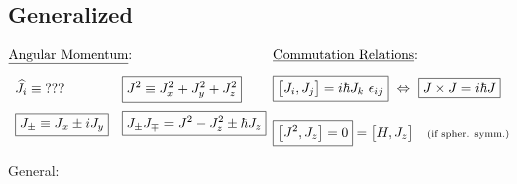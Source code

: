 \documentclass[12pt]{article}
\newcommand{\hs}{\hspace{1pt}} %
\begin{document}
\subsection{Generalized}
\noindent
\(
    \begin{aligned}[t]
        & \text{\underline{Angular Momentum}:}
            \\[5pt]
        & \begin{array}[t]{l l}
                \widehat{J}_i \equiv \text{???} & \boxed{ J^2 \equiv J_x^2 + J_y^2 + J_z^2 } \\[10pt]
                \boxed{ J_\pm \equiv J_x \pm i J_y } & \boxed{ J_\pm J_\mp = J^2 - J_z^2 \pm \hbar J_z }
            \end{array}
    \end{aligned}
    \hfill
    \begin{aligned}[t]
        & \text{\underline{Commutation Relations}:} \\[5pt]
        & \boxed{ \big[ J_i , J_j \big] = i \hbar J_k \ \epsilon_{ij} }
            \ \Leftrightarrow\ 
            \boxed{ J \times J = i \hbar J }
            \\[10pt]
        & \boxed{ \big[ J^2 , J_z \big] = 0 } = \big[ H , J_z \big]
            \hspace{10pt} \text{\scriptsize (if spher. symm.)}
    \end{aligned}
    \hfill\hs
\)

\vspace{15pt} \noindent
General: \ 
\end{document}
